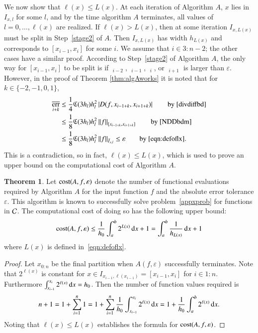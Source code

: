 \documentclass[review]{elsarticle}
\newcommand{\abstol}{\varepsilon}
\newcommand{\oton}{1\!:\!n}
\theoremstyle{definition}
\newcommand{\Ixl}{I_{x,l}}
\DeclareMathOperator{\oerr}{\overline{err}}
\newtheorem{theorem}{Theorem}
\begin{document}
We now show that $\ell(x) \le L(x)$. At each iteration of Algorithm $A$, $x$
lies in $\Ixl$ for some $l$, and by the time algorithm $A$ terminates, all
values of $l = 0, \ldots, \ell(x)$ are realized. If $\ell(x) > L(x)$, then at
some iteration $I_{x,L(x)}$ must be split in Step~\ref{stage2} of $A$.  Then $I_{x,L(x)}$ has width $h_{L(x)}$ and corresponds to $[x_{i-1},x_i]$ for some $i$.  We assume that $i \in 3\!:\!n-2$; the other cases have a similar proof.
According to Step~\ref{stage2} of Algorithm $A$, the only way for $[x_{i-1},x_i]$ to be split is if $\oerr_{i-2}$, $\oerr_{i-1}$, $\oerr_{i}$, or $\oerr_{i+1}$ is larger than $\abstol$.  However, in the proof of Theorem \ref{thm:algAworks} it is noted that for $k \in \{-2, -1, 0, 1\}$,
\begin{align*}
\oerr_{i+k} & \le \frac{1}4 \fC(3h_l) h_l^2 \abs{D(f,x_{i-1+k},x_{i+1+k})} \qquad \text{by \eqref{divdiffbd}} \\
& \le \frac{1} 8 \fC(3h_l) h_l^2 \norm[{[x_{i-1+k},x_{i+1+k}]}]{f}  \qquad \text{by \eqref{NDDbdm}}\\
& \le \frac{1} 8 \fC(3h_l) h_l^2 \norm[\bar{I}_{x,l}]{f} \le \varepsilon \qquad \text{by \eqref{eqn:defoflx}}.
\end{align*}
This is a contradiction, so in fact, $\ell(x) \le L(x)$, which is used to prove an upper bound on the
computational cost of Algorithm $A$.

\begin{theorem}\label{thm:cost}
Let $\cost(A,f,\abstol)$ denote the number of functional evaluations required by
Algorithm $A$ for the input function $f$ and the absolute error tolerance
$\abstol$. This algorithm is known to successfully solve
problem~\eqref{appxprob} for functions in $\mathcal{C}$. The computational cost of doing
so has the following upper bound:
\begin{equation*}
\cost(A,f,\abstol) \le \frac{1}{h_0}\int_a^b 2^{L(x)} \, \dif x +1 = \int_a^b \frac{1}{h_{L(x)}} \, \dif x +1 \\
\end{equation*}
where $L(x)$ is defined in~\eqref{eqn:defoflx}.
\end{theorem}

\begin{proof}
Let $x_{0:n}$ be the final partition when $A(f,\abstol)$
successfully terminates. Note that $2^{\ell(x)}$ is constant for $x \in
I_{x_{i-1},\ell(x_{i-1})} = [x_{i-1},x_{i}]$ for $i \in \oton$. Furthermore
$\int_{x_{i-1}}^{x_{i}} 2^{\ell(x)} \, {\rm d} x = h_0$. Then the number of
function values required is
\begin{equation*}
n+1 = 1 + \sum_{i=1}^{n} 1 = 1 + \sum_{i=1}^{n} \frac{1}{h_0} \int_{x_{i-1}}^{x_{i}} 2^{\ell(x)} \, {\rm d}  x = 1 + \frac{1}{h_0}\int_a^b 2^{\ell(x)} \, {\rm d} x.
\end{equation*}
Noting that $\ell(x) \le L(x)$ establishes the formula for $\cost(A,f,\abstol)$.
\end{proof}
\end{document}
